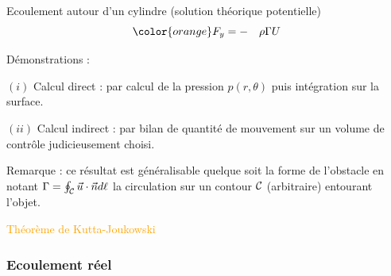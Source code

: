 \begin{frame}{Ecoulement autour d'un cylindre (solution théorique potentielle)}
$${\color{orange} F_y =    - \quad \rho \Gamma U }$$ 



\medskip

{\color{vert}Démonstrations :}

$(i)$ Calcul direct : par calcul de la pression $p(r,\theta)$ puis intégration sur la surface.

$(ii)$ Calcul indirect : par bilan de quantité de mouvement sur un volume de contrôle judicieusement choisi. 

\pause
\smallskip Remarque : ce résultat est généralisable quelque soit la forme de l'obstacle en notant $\Gamma = \oint_{{\cal C}} \vec u \cdot \vec n d \ell$
la circulation sur un contour $\cal C$ (arbitraire) entourant l'objet.

\textcolor{orange}{Théorème de Kutta-Joukowski}



\vspace{0mm}
\end{frame}








\subsubsection{Ecoulement réel }







